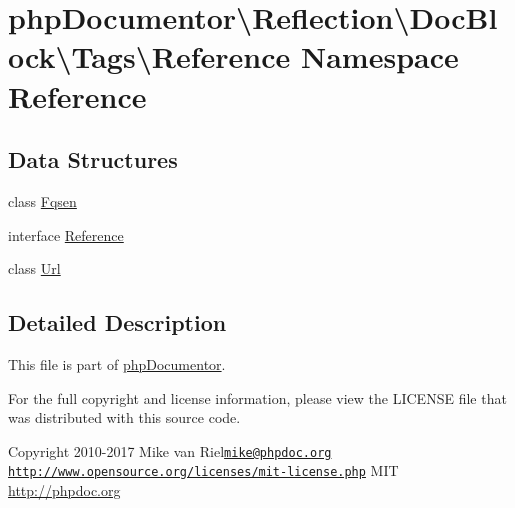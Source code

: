 \hypertarget{namespacephp_documentor_1_1_reflection_1_1_doc_block_1_1_tags_1_1_reference}{}\section{php\+Documentor\textbackslash{}Reflection\textbackslash{}Doc\+Block\textbackslash{}Tags\textbackslash{}Reference Namespace Reference}
\label{namespacephp_documentor_1_1_reflection_1_1_doc_block_1_1_tags_1_1_reference}
\subsection*{Data Structures}
\begin{DoxyCompactItemize}
\item 
class \mbox{\hyperlink{classphp_documentor_1_1_reflection_1_1_doc_block_1_1_tags_1_1_reference_1_1_fqsen}{Fqsen}}
\item 
interface \mbox{\hyperlink{interfacephp_documentor_1_1_reflection_1_1_doc_block_1_1_tags_1_1_reference_1_1_reference}{Reference}}
\item 
class \mbox{\hyperlink{classphp_documentor_1_1_reflection_1_1_doc_block_1_1_tags_1_1_reference_1_1_url}{Url}}
\end{DoxyCompactItemize}


\subsection{Detailed Description}
This file is part of \mbox{\hyperlink{namespacephp_documentor}{php\+Documentor}}.

For the full copyright and license information, please view the L\+I\+C\+E\+N\+SE file that was distributed with this source code.

\begin{DoxyCopyright}{Copyright}
2010-\/2017 Mike van Riel\href{mailto:mike@phpdoc.org}{\tt mike@phpdoc.\+org}  \href{http://www.opensource.org/licenses/mit-license.php}{\tt http\+://www.\+opensource.\+org/licenses/mit-\/license.\+php} M\+IT \mbox{\hyperlink{}{http\+://phpdoc.\+org}}
\end{DoxyCopyright}
